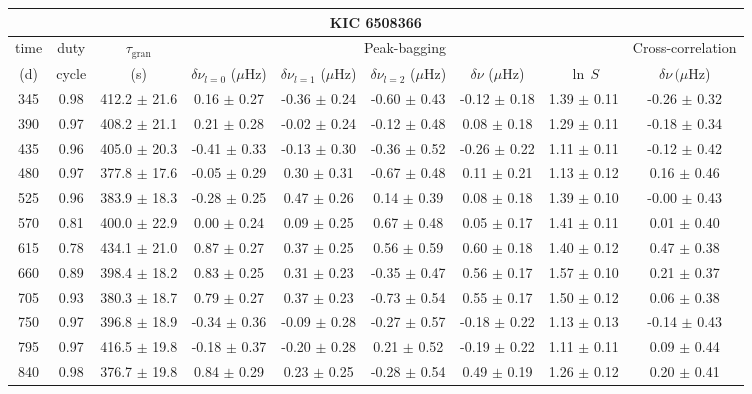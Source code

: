 \documentclass[twocolumn]{aastex61}%
\begin{document}
\begin{table*}[ht]\centering\fontsize{9.}{7.}\selectfont
\begin{tabular}{ccc|ccccc|c}
\multicolumn{9}{c}{KIC 6508366}\\ \hline\hline
time & duty & $\tau_\text{gran}$ &\multicolumn{5}{c|}{Peak-bagging}&Cross-correlation\\
(d)& cycle & (s)&$\delta\nu_{l=0}$ ($\mu$Hz) & $\delta\nu_{l=1}$ ($\mu$Hz) & $\delta\nu_{l=2}$ ($\mu$Hz) & $\delta\nu$ ($\mu$Hz)& $\ln\,S$ & $\delta\nu\,(\mu$Hz)\\\hline
345 & 0.98 & 412.2 $\pm$ 21.6 & 0.16 $\pm$ 0.27 & -0.36 $\pm$ 0.24 & -0.60 $\pm$ 0.43 & -0.12 $\pm$ 0.18 & 1.39 $\pm$ 0.11 & -0.26 $\pm$ 0.32\\
390 & 0.97 & 408.2 $\pm$ 21.1 & 0.21 $\pm$ 0.28 & -0.02 $\pm$ 0.24 & -0.12 $\pm$ 0.48 & 0.08 $\pm$ 0.18 & 1.29 $\pm$ 0.11 & -0.18 $\pm$ 0.34\\
435 & 0.96 & 405.0 $\pm$ 20.3 & -0.41 $\pm$ 0.33 & -0.13 $\pm$ 0.30 & -0.36 $\pm$ 0.52 & -0.26 $\pm$ 0.22 & 1.11 $\pm$ 0.11 & -0.12 $\pm$ 0.42\\
480 & 0.97 & 377.8 $\pm$ 17.6 & -0.05 $\pm$ 0.29 & 0.30 $\pm$ 0.31 & -0.67 $\pm$ 0.48 & 0.11 $\pm$ 0.21 & 1.13 $\pm$ 0.12 & 0.16 $\pm$ 0.46\\
525 & 0.96 & 383.9 $\pm$ 18.3 & -0.28 $\pm$ 0.25 & 0.47 $\pm$ 0.26 & 0.14 $\pm$ 0.39 & 0.08 $\pm$ 0.18 & 1.39 $\pm$ 0.10 & -0.00 $\pm$ 0.43\\
570 & 0.81 & 400.0 $\pm$ 22.9 & 0.00 $\pm$ 0.24 & 0.09 $\pm$ 0.25 & 0.67 $\pm$ 0.48 & 0.05 $\pm$ 0.17 & 1.41 $\pm$ 0.11 & 0.01 $\pm$ 0.40\\
615 & 0.78 & 434.1 $\pm$ 21.0 & 0.87 $\pm$ 0.27 & 0.37 $\pm$ 0.25 & 0.56 $\pm$ 0.59 & 0.60 $\pm$ 0.18 & 1.40 $\pm$ 0.12 & 0.47 $\pm$ 0.38\\
660 & 0.89 & 398.4 $\pm$ 18.2 & 0.83 $\pm$ 0.25 & 0.31 $\pm$ 0.23 & -0.35 $\pm$ 0.47 & 0.56 $\pm$ 0.17 & 1.57 $\pm$ 0.10 & 0.21 $\pm$ 0.37\\
705 & 0.93 & 380.3 $\pm$ 18.7 & 0.79 $\pm$ 0.27 & 0.37 $\pm$ 0.23 & -0.73 $\pm$ 0.54 & 0.55 $\pm$ 0.17 & 1.50 $\pm$ 0.12 & 0.06 $\pm$ 0.38\\
750 & 0.97 & 396.8 $\pm$ 18.9 & -0.34 $\pm$ 0.36 & -0.09 $\pm$ 0.28 & -0.27 $\pm$ 0.57 & -0.18 $\pm$ 0.22 & 1.13 $\pm$ 0.13 & -0.14 $\pm$ 0.43\\
795 & 0.97 & 416.5 $\pm$ 19.8 & -0.18 $\pm$ 0.37 & -0.20 $\pm$ 0.28 & 0.21 $\pm$ 0.52 & -0.19 $\pm$ 0.22 & 1.11 $\pm$ 0.11 & 0.09 $\pm$ 0.44\\
840 & 0.98 & 376.7 $\pm$ 19.8 & 0.84 $\pm$ 0.29 & 0.23 $\pm$ 0.25 & -0.28 $\pm$ 0.54 & 0.49 $\pm$ 0.19 & 1.26 $\pm$ 0.12 & 0.20 $\pm$ 0.41\\

\end{tabular}
\end{table*}
\end{document}
